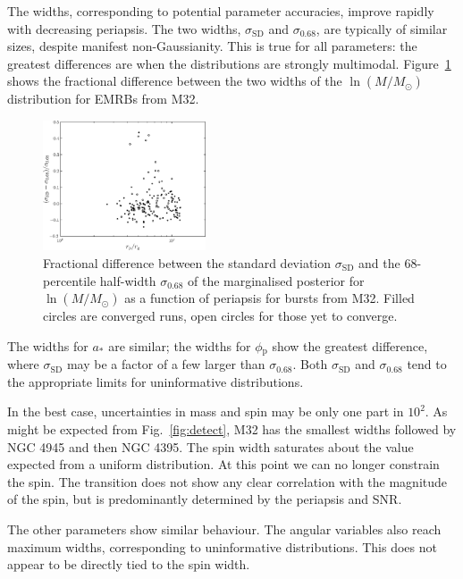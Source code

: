 \documentclass[useAMS,usedcolumn,usegraphicx,usenatbib]{mn2e}
\newcommand{\figref}[1]{Fig.~\ref{fig:#1}}
\newcommand{\Figref}[1]{Figure~\ref{fig:#1}}
\newcommand{\sub}[1]{\ensuremath{_\mathrm{#1}}}
\begin{document}
The widths, corresponding to potential parameter accuracies, improve rapidly with decreasing periapsis. The two widths, $\sigma\sub{SD}$ and $\sigma_{0.68}$, are typically of similar sizes, despite manifest non-Gaussianity. This is true for all parameters: the greatest differences are when the distributions are strongly multimodal. \Figref{sigma-ratio-mass} shows the fractional difference between the two widths of the $\ln(M/M_\odot)$ distribution for EMRBs from M32.
\begin{figure}
\begin{center}
   \includegraphics[width=0.43\textwidth]{Fig_M32_MCMC_sigma_ratio_rp_1}
\caption{Fractional difference between the standard deviation $\sigma\sub{SD}$ and the $68$-percentile half-width $\sigma_{0.68}$ of the marginalised posterior for $\ln(M/M_\odot)$ as a function of periapsis for bursts from M32. Filled circles are converged runs, open circles for those yet to converge.\label{fig:sigma-ratio-mass}}
\end{center}
\end{figure}
The widths for $a_\ast$ are similar; the widths for $\phi\sub{p}$ show the greatest difference, where $\sigma\sub{SD}$ may be a factor of a few larger than $\sigma_{0.68}$. Both $\sigma\sub{SD}$ and $\sigma_{0.68}$ tend to the appropriate limits for uninformative distributions.

In the best case, uncertainties in mass and spin may be only one part in $10^2$. As might be expected from \figref{detect}, M32 has the smallest widths followed by NGC 4945 and then NGC 4395. The spin width saturates about the value expected from a uniform distribution. At this point we can no longer constrain the spin. The transition does not show any clear correlation with the magnitude of the spin, but is predominantly determined by the periapsis and SNR.

The other parameters show similar behaviour. The angular variables also reach maximum widths, corresponding to uninformative distributions. This does not appear to be directly tied to the spin width.
\end{document}
